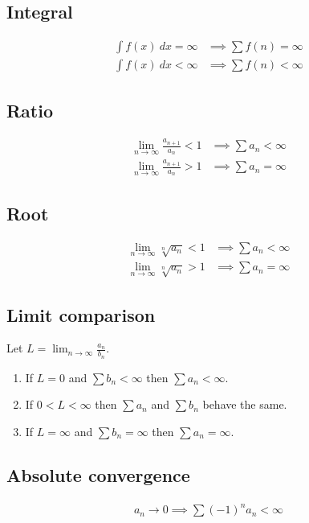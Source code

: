 \documentclass[12pt]{article}
\begin{document}
\begin{multicols}{2}
\subsection*{Integral}
\begin{align*}
    \int f(x)\ dx = \infty &\implies \sum f(n) = \infty \\
    \int f(x)\ dx < \infty &\implies \sum f(n) < \infty
\end{align*}

\subsection*{Ratio}
\begin{align*}
    \lim_{n\to\infty} \frac{a_{n+1}}{a_n} < 1 &\implies \sum a_n < \infty\\
    \lim_{n\to\infty} \frac{a_{n+1}}{a_n} > 1 &\implies \sum a_n = \infty
\end{align*}

\subsection*{Root}
\begin{align*}
    \lim_{n\to\infty} \sqrt[n]{a_n} < 1 &\implies \sum a_n < \infty \\
    \lim_{n\to\infty} \sqrt[n]{a_n} > 1 &\implies \sum a_n = \infty
\end{align*}

\subsection*{Limit comparison}
Let $L = \lim_{n\to\infty} \frac{a_n}{b_n}$.
\begin{enumerate}
    \item If $L=0$ and $\sum b_n < \infty$ then $\sum a_n < \infty$.
    \item If $0<L<\infty$ then $\sum a_n$ and $\sum b_n$ behave the same.
    \item If $L=\infty$ and $\sum b_n = \infty$ then $\sum a_n = \infty$.
\end{enumerate}

\subsection*{Absolute convergence}
\begin{align*}
    a_n \to 0 \implies \sum (-1)^{n} a_n < \infty
\end{align*}




\end{multicols}
\end{document}
